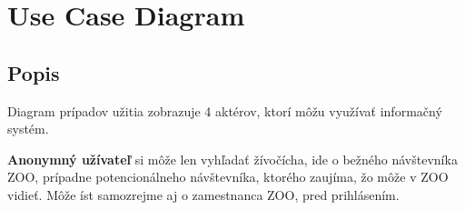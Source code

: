 \documentclass[11pt, a4paper]{article}
\begin{document}
		\section{Use Case Diagram}
		\newpage
		\subsection{Popis}
		\label{usecase}
			Diagram prípadov užitia zobrazuje 4 aktérov, ktorí môžu využívať informačný systém.

			\textbf{Anonymný užívateľ} si môže len vyhľadať žívočícha, ide o bežného návštevníka ZOO, prípadne potencionálneho návštevníka, ktorého zaujíma, žo môže v ZOO vidieť. Môže íst samozrejme aj o zamestnanca ZOO, pred prihlásením.
\end{document}
